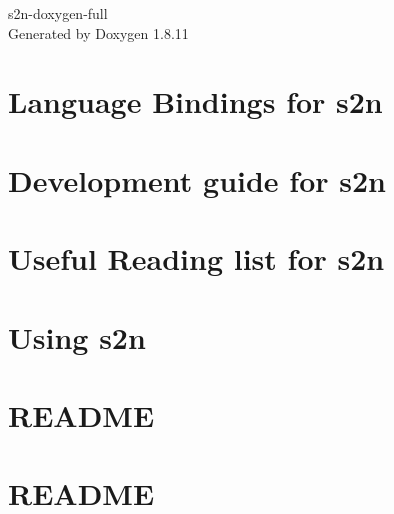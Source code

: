 \documentclass[twoside]{book}
\newcommand{\+}{\discretionary{\mbox{\scriptsize$\hookleftarrow$}}{}{}}
\newcommand{\clearemptydoublepage}{%
  \newpage{\pagestyle{empty}\cleardoublepage}%
}
\begin{document}
\hypersetup{pageanchor=false,
             bookmarksnumbered=true,
             pdfencoding=unicode
            }
\begin{titlepage}
\vspace*{7cm}
\begin{center}%
{\Large s2n-\/doxygen-\/full }\\
\vspace*{1cm}
{\large Generated by Doxygen 1.8.11}\\
\end{center}
\end{titlepage}
\clearemptydoublepage
\tableofcontents
\clearemptydoublepage
{}
\hypersetup{pageanchor=true}

\chapter{Language Bindings for s2n}
\label{md_s2n-master_docs_BINDINGS}
\hypertarget{md_s2n-master_docs_BINDINGS}{}

\chapter{Development guide for s2n}
\label{md_s2n-master_docs_DEVELOPMENT-GUIDE}
\hypertarget{md_s2n-master_docs_DEVELOPMENT-GUIDE}{}

\chapter{Useful Reading list for s2n}
\label{md_s2n-master_docs_READING-LIST}
\hypertarget{md_s2n-master_docs_READING-LIST}{}

\chapter{Using s2n}
\label{md_s2n-master_docs_USAGE-GUIDE}
\hypertarget{md_s2n-master_docs_USAGE-GUIDE}{}

\chapter{R\+E\+A\+D\+ME}
\label{md_s2n-master_libcrypto-build_README}
\hypertarget{md_s2n-master_libcrypto-build_README}{}

\chapter{R\+E\+A\+D\+ME}
\label{md_s2n-master_libcrypto-root_README}
\hypertarget{md_s2n-master_libcrypto-root_README}{}

\end{document}
